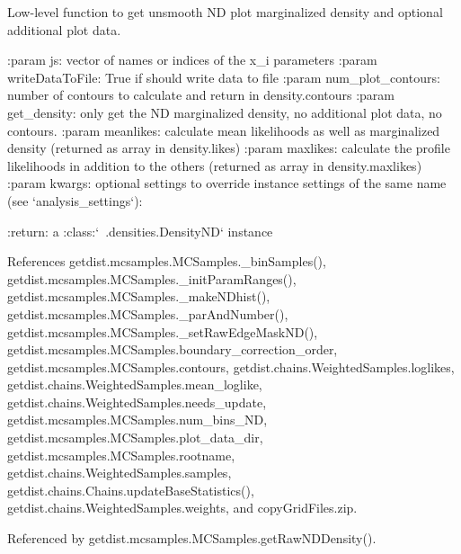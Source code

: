 \begin{DoxyVerb}Low-level function to get unsmooth ND plot marginalized
density and optional additional plot data.

:param js: vector of names or indices of the x_i parameters
:param writeDataToFile: True if should write data to file
:param num_plot_contours: number of contours to calculate and return in density.contours
:param get_density: only get the ND marginalized density, no additional plot data, no contours.
:param meanlikes: calculate mean likelihoods as well as marginalized density (returned as array in density.likes)
:param maxlikes: calculate the profile likelihoods in addition to the others (returned as array in density.maxlikes)
:param kwargs: optional settings to override instance settings of the same name (see `analysis_settings`):
       
:return: a :class:`~.densities.DensityND` instance
\end{DoxyVerb}
 

References getdist.\+mcsamples.\+M\+C\+Samples.\+\_\+bin\+Samples(), getdist.\+mcsamples.\+M\+C\+Samples.\+\_\+init\+Param\+Ranges(), getdist.\+mcsamples.\+M\+C\+Samples.\+\_\+make\+N\+Dhist(), getdist.\+mcsamples.\+M\+C\+Samples.\+\_\+par\+And\+Number(), getdist.\+mcsamples.\+M\+C\+Samples.\+\_\+set\+Raw\+Edge\+Mask\+N\+D(), getdist.\+mcsamples.\+M\+C\+Samples.\+boundary\+\_\+correction\+\_\+order, getdist.\+mcsamples.\+M\+C\+Samples.\+contours, getdist.\+chains.\+Weighted\+Samples.\+loglikes, getdist.\+chains.\+Weighted\+Samples.\+mean\+\_\+loglike, getdist.\+chains.\+Weighted\+Samples.\+needs\+\_\+update, getdist.\+mcsamples.\+M\+C\+Samples.\+num\+\_\+bins\+\_\+\+ND, getdist.\+mcsamples.\+M\+C\+Samples.\+plot\+\_\+data\+\_\+dir, getdist.\+mcsamples.\+M\+C\+Samples.\+rootname, getdist.\+chains.\+Weighted\+Samples.\+samples, getdist.\+chains.\+Chains.\+update\+Base\+Statistics(), getdist.\+chains.\+Weighted\+Samples.\+weights, and copy\+Grid\+Files.\+zip.



Referenced by getdist.\+mcsamples.\+M\+C\+Samples.\+get\+Raw\+N\+D\+Density().


